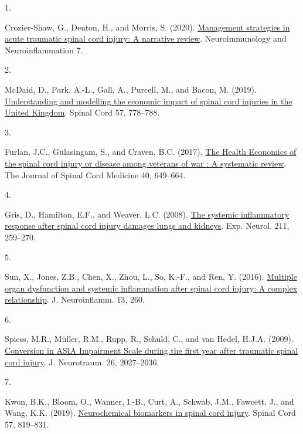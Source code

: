 \documentclass[
]{article}
\newlength{\cslhangindent}
\newlength{\csllabelwidth}
\newlength{\cslentryspacingunit} %
\newenvironment{CSLReferences}[2] %
 {%
  \setlength{\parindent}{0pt}
  \ifodd #1
  \let\oldpar\par
  \def\par{\hangindent=\cslhangindent\oldpar}
  \fi
  \setlength{\parskip}{#2\cslentryspacingunit}
 }%
 {}
\newcommand{\CSLLeftMargin}[1]{\parbox[t]{\csllabelwidth}{#1}}
\newcommand{\CSLRightInline}[1]{\parbox[t]{\linewidth - \csllabelwidth}{#1}\break}
\begin{document}
\hypertarget{refs}{}
\begin{CSLReferences}{0}{0}
\leavevmode{}%
\CSLLeftMargin{1. }
\CSLRightInline{Crozier-Shaw, G., Denton, H., and Morris, S. (2020). \href{https://doi.org/10.20517/2347-8659.2019.005}{Management strategies in acute traumatic spinal cord injury: A narrative review}. Neuroimmunology and Neuroinflammation 7.}

\leavevmode{}%
\CSLLeftMargin{2. }
\CSLRightInline{McDaid, D., Park, A.-L., Gall, A., Purcell, M., and Bacon, M. (2019). \href{https://doi.org/10.1038/s41393-019-0285-1}{Understanding and modelling the economic impact of spinal cord injuries in the {United Kingdom}}. Spinal Cord 57, 778--788.}

\leavevmode{}%
\CSLLeftMargin{3. }
\CSLRightInline{Furlan, J.C., Gulasingam, S., and Craven, B.C. (2017). \href{https://doi.org/10.1080/10790268.2017.1368267}{The {Health Economics} of the spinal cord injury or disease among veterans of war : {A} systematic review}. The Journal of Spinal Cord Medicine 40, 649--664.}

\leavevmode{}%
\CSLLeftMargin{4. }
\CSLRightInline{Gris, D., Hamilton, E.F., and Weaver, L.C. (2008). \href{https://doi.org/10.1016/J.EXPNEUROL.2008.01.033}{The systemic inflammatory response after spinal cord injury damages lungs and kidneys}. Exp. Neurol. 211, 259--270.}

\leavevmode{}%
\CSLLeftMargin{5. }
\CSLRightInline{Sun, X., Jones, Z.B., Chen, X., Zhou, L., So, K.-F., and Ren, Y. (2016). \href{https://doi.org/10.1186/s12974-016-0736-y}{Multiple organ dysfunction and systemic inflammation after spinal cord injury: A complex relationship}. J. Neuroinflamm. 13, 260.}

\leavevmode{}%
\CSLLeftMargin{6. }
\CSLRightInline{Spiess, M.R., Müller, R.M., Rupp, R., Schuld, C., and van Hedel, H.J.A. (2009). \href{https://doi.org/10.1089/neu.2008.0760}{Conversion in {ASIA Impairment Scale} during the first year after traumatic spinal cord injury}. J. Neurotraum. 26, 2027--2036.}

\leavevmode{}%
\CSLLeftMargin{7. }
\CSLRightInline{Kwon, B.K., Bloom, O., Wanner, I.-B., Curt, A., Schwab, J.M., Fawcett, J., and Wang, K.K. (2019). \href{https://doi.org/10.1038/s41393-019-0319-8}{Neurochemical biomarkers in spinal cord injury}. Spinal Cord 57, 819--831.}


\end{CSLReferences}
\end{document}
